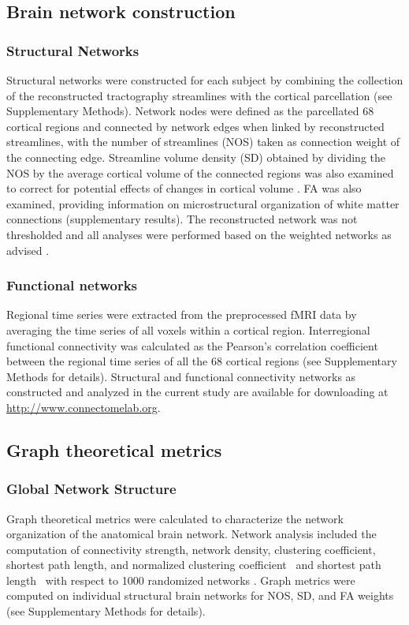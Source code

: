 \begin{refsection}
\subsection*{Brain network construction}
\subsubsection*{Structural Networks}
Structural networks were constructed for each subject by combining the collection of the reconstructed tractography streamlines with the cortical parcellation (see Supplementary Methods). Network nodes were defined as the parcellated 68 cortical regions and connected by network edges when linked by reconstructed streamlines, with the number of streamlines (NOS) taken as connection weight of the connecting edge. Streamline volume density (SD) obtained by dividing the NOS by the average cortical volume of the connected regions was also examined to correct for potential effects of changes in cortical volume \citep{vanDenHeuvel2011RichclubOO,Hagmann2008MappingTS}. FA was also examined, providing information on microstructural organization of white matter connections (supplementary results). The reconstructed network was not thresholded and all analyses were performed based on the weighted networks as advised \citep{vanWijk2010ComparingBN,vanDenHeuvel2017ProportionalTI}.

\subsubsection*{Functional networks}
Regional time series were extracted from the preprocessed fMRI data by averaging the time series of all voxels within a cortical region. Interregional functional connectivity was calculated as the Pearson's correlation coefficient between the regional time series of all the 68 cortical regions (see Supplementary Methods for details). Structural and functional connectivity networks as constructed and analyzed in the current study are available for downloading at \url{http://www.connectomelab.org}.

\subsection*{Graph theoretical metrics}
\subsubsection*{Global Network Structure}
Graph theoretical metrics were calculated to characterize the network organization of the anatomical brain network. Network analysis included the computation of connectivity strength, network density, clustering coefficient, shortest path length, and normalized clustering coefficient \textgamma \ and shortest path length \textlambda \ with respect to 1000 randomized networks \citep{RUBINOV20101059}. Graph metrics were computed on individual structural brain networks for NOS, SD, and FA weights (see Supplementary Methods for details).


\end{refsection}
